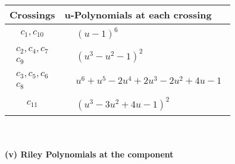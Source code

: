 \documentclass[1p]{elsarticle_modified}
\theoremstyle{definition}
\begin{document}
\begin{tabular}{m{50pt}|m{274pt}}
Crossings & \hspace{64pt}u-Polynomials at each crossing \\
\hline $$\begin{aligned}c_{1},c_{10}\end{aligned}$$&$\begin{aligned}
&(u-1)^6
\end{aligned}$\\
\hline $$\begin{aligned}c_{2},c_{4},c_{7}\\c_{9}\end{aligned}$$&$\begin{aligned}
&(u^3- u^2-1)^2
\end{aligned}$\\
\hline $$\begin{aligned}c_{3},c_{5},c_{6}\\c_{8}\end{aligned}$$&$\begin{aligned}
&u^6+u^5-2 u^4+2 u^3-2 u^2+4 u-1
\end{aligned}$\\
\hline $$\begin{aligned}c_{11}\end{aligned}$$&$\begin{aligned}
&(u^3-3 u^2+4 u-1)^2
\end{aligned}$\\
\hline
\end{tabular}\\~\\
\newpage\renewcommand{\arraystretch}{1}
\flushleft \textbf{(v) Riley Polynomials at the component}\newline \\
\end{document}

